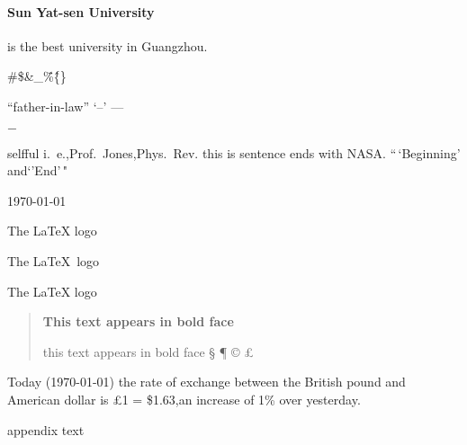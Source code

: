 \documentclass[12pt,twoside,twocolumn,a4paper]{article}   %
\begin{document}
				\paragraph{Sun Yat-sen University} is the best university in Guangzhou.

	\#\$\&\_\"\%\^\{\}

	``father-in-law'' `--' ---

	$-$

	selfful
	i.~e.,Prof.~Jones,Phys.\ Rev. %
	this is sentence ends with NASA\@. %
	\frenchspacing %
	\nonfrenchspacing  %
	``\,`Beginning' and`'End'\,"
	
	\today

	The \LaTeX{} logo

	The \LaTeX\ logo

	The {\LaTeX} logo

	\begin{quote}
		{\bfseries This text appears in bold face}

		\setlength{\parindent}{0.5cm} this text appears in bold face
		\setlength{\textwidth}{12.5cm}
			\S 
			\ddag 
			\P
			\copyright 
			\pounds			
	\end{quote}
	Today (\today) the rate of exchange between the British pound and American dollar is \pounds 1 = \$1.63,an increase of 1\% over yesterday.

	\setlength{\parskip}{1.5ex} %
	\setlength{\parindent}{0em} %
	\renewcommand{\baselinestretch}{2} %
	\setlength{\textwidth}{12.5cm} %
	\begin{appendix}
		appendix text
	\end{appendix}
\end{document}
